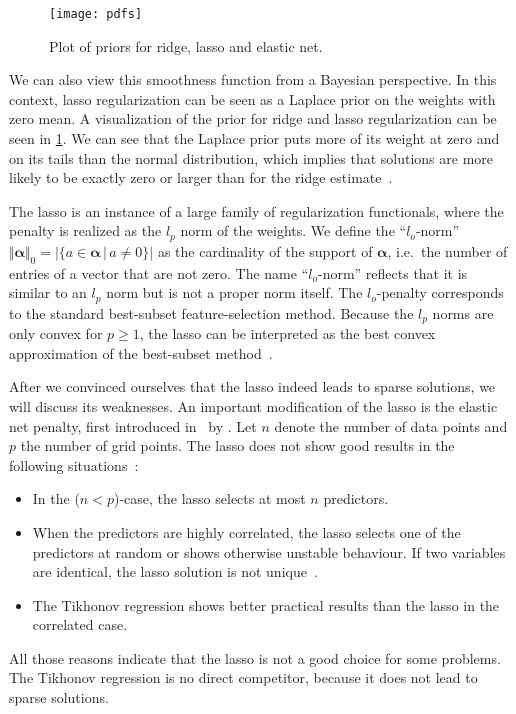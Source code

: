 \begin{figure}[tb]
    \centering
    \texttt{[image: pdfs]}
    \caption{Plot of priors for ridge, lasso and elastic net.}\label{fig:reg-pdfs}
\end{figure}

We can also view this smoothness function from a Bayesian perspective.
In this context, lasso regularization can be seen as a Laplace prior on the
weights with zero mean.
A visualization of the prior for ridge and lasso regularization can be seen in \cref{fig:reg-pdfs}.
We can see that the Laplace prior puts more of its weight at zero and on its
tails than the normal distribution, which implies that solutions are more likely
to be exactly zero or larger than for the ridge estimate~\cite{lasso}.

The lasso is an instance of a large family of regularization functionals, where the penalty is realized as the \(l_p\) norm of the weights.
We define the ``\(l_o\)-norm'' \(\Vert \bm{\alpha} \Vert_0 = \vert \{a \in
\bm{\alpha} \, | \, a \neq 0\} \vert\) as the cardinality of the support of \(\bm{\alpha}\), i.e.~the number of entries of a vector that are not zero.
The name ``\(l_o\)-norm'' reflects that it is similar to an \(l_p\) norm but is
not a proper norm itself.
The \(l_o\)-penalty corresponds to the standard best-subset feature-selection method.
Because the \(l_p\) norms are only convex for \(p \geq 1\), the lasso can be interpreted as the best convex approximation of the best-subset method~\cite{sparse-learning,lasso}.

After we convinced ourselves that the lasso indeed leads to sparse
solutions, we will discuss its weaknesses.
An important modification of the lasso is the elastic net penalty, first introduced in~\cite{elasticnet} by \citeauthor{elasticnet}.
Let \(n\) denote the number of data points and \(p\) the number of grid points. The lasso does not show good results in the following situations~\cite{elasticnet}:
\begin{itemize}
\item In the (\(n < p\))-case, the lasso selects at most \(n\) predictors.
\item When the predictors are highly correlated, the lasso selects one of the
  predictors at random or shows otherwise unstable behaviour.
  If two variables are identical, the lasso solution is not unique~\cite{sparse-learning}.
\item The Tikhonov regression shows better practical results than the lasso in the
  correlated case.
\end{itemize}
All those reasons indicate that the lasso is not a good choice for some problems.
The Tikhonov regression is no direct competitor, because it does not lead to
sparse solutions.

